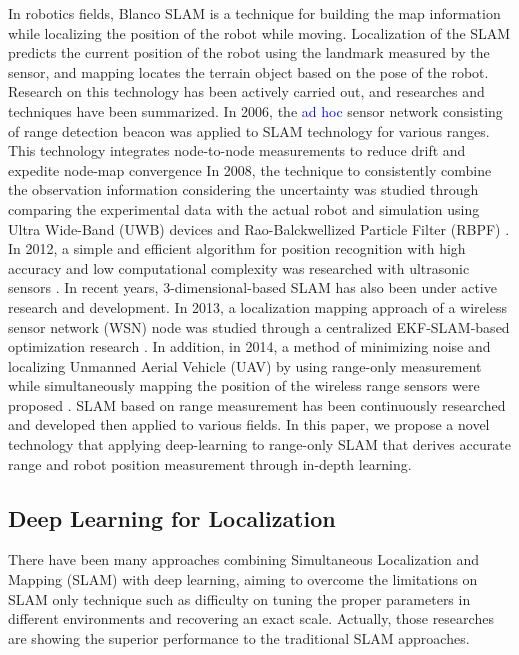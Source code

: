\documentclass{ieeeaccess}
\begin{document}
In robotics fields, Blanco SLAM is a technique for building the map information while localizing the position of the robot while moving. Localization of the SLAM predicts the current position of the robot using the landmark measured by the sensor, and mapping locates the terrain object based on the pose of the robot. Research on this technology has been actively carried out, and researches and techniques have been summarized. In 2006, the \textcolor{blue}{ad hoc} sensor network consisting of range detection beacon was applied to SLAM technology for various ranges. This technology integrates node-to-node measurements to reduce drift and expedite node-map convergence \cite{djugash2006range} In 2008, the technique to consistently combine the observation information considering the uncertainty was studied through comparing the experimental data with the actual robot and simulation using Ultra Wide-Band (UWB) devices and Rao-Balckwellized Particle Filter (RBPF) \cite{blanco2008pure}.  In 2012, a simple and efficient algorithm for position recognition with high accuracy and low computational complexity was researched with ultrasonic sensors \cite{yang2012efficient}. In recent years, 3-dimensional-based SLAM has also been under active research and development. In 2013, a localization mapping approach of a wireless sensor network (WSN) node was studied through a centralized EKF-SLAM-based optimization research \cite{fabresse2013undelayed}. In addition, in 2014, a method of minimizing noise and localizing Unmanned Aerial Vehicle (UAV) by using  range-only measurement while simultaneously mapping the position of the wireless range sensors were proposed \cite{fabresse2014robust}. 
SLAM based on range measurement has been continuously researched and developed then applied to various fields. In this paper, we propose a novel technology that applying deep-learning to range-only SLAM that derives accurate range and robot position measurement through in-depth learning. 


\subsection{Deep Learning for Localization}
There have been many approaches combining Simultaneous Localization and Mapping (SLAM) with deep learning, aiming to overcome the limitations on SLAM only technique such as difficulty on tuning the proper parameters in different environments and recovering an exact scale. Actually, those researches are showing the superior performance to the traditional SLAM approaches.
\end{document}

